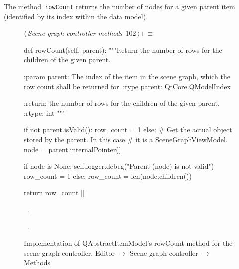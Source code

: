 \documentclass[%
    a4paper,    %
    justified,  %
    nobib,      %
    openany     %
]{tufte-book}
\makeatletter
\renewcommand{\label}[1]{\@tufte@label{##1}}%
\makeatother
\begin{document}
The method~\verb=rowCount= returns the number of nodes for a given parent
item (identified by its index within the data model).

\begin{figure}[!htbp]
\begin{flushleft} \small
\begin{minipage}{\linewidth}\label{scrap33}\raggedright\small
{} $\langle\,${\itshape Scene graph controller methods}\nobreak\ {\footnotesize {102}}$\,\rangle+\equiv$
\vspace{-1ex}
\begin{pythoncode}
def rowCount(self, parent):
    """Return the number of rows for the children of the given
    parent.

    :param parent: The index of the item in the scene graph, which
                   the row count shall be returned for.
    :type  parent: QtCore.QModelIndex

    :return: the number of rows for the children of the given
             parent.
    :rtype:  int
    """

    if not parent.isValid():
        row_count = 1
    else:
        # Get the actual object stored by the parent. In this case
        # it is a SceneGraphViewModel.
        node = parent.internalPointer()

        if node is None:
            self.logger.debug("Parent (node) is not valid")
            row_count = 1
        else:
            row_count = len(node.children())

    return row_count
|\NWsep|
\end{pythoncode}
\vspace{1.5ex}
\footnotesize
\begin{list}{}{\setlength{\itemsep}{-\parsep}\setlength{\itemindent}{-\leftmargin}}
\item \NWtxtMacroDefBy\ .
\item \NWtxtMacroRefIn\ .

\item{}
\end{list}
\end{minipage}\vspace{4ex}
\end{flushleft}
\caption{Implementation of QAbstractItemModel's rowCount method for the scene
  graph controller.
  \newline{}\newline{}Editor $\rightarrow$ Scene graph controller $\rightarrow$
  Methods}
\end{figure}
\end{document}
